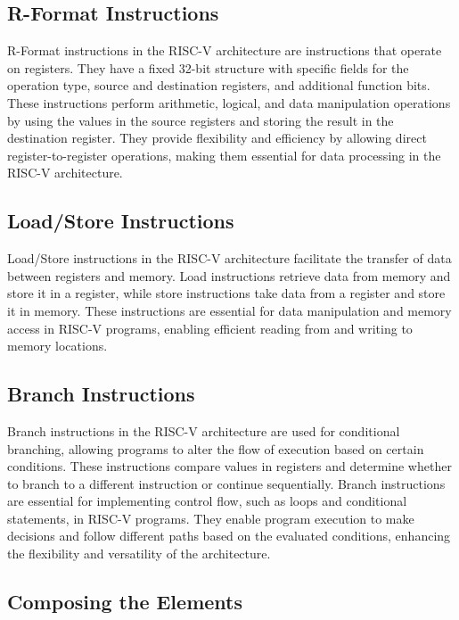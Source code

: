         \subsection{R-Format Instructions}
        
        R-Format instructions in the RISC-V architecture are instructions that operate on registers. They have a fixed 32-bit structure with specific fields for the operation type, source and destination registers, and additional function bits. These instructions perform arithmetic, logical, and data manipulation operations by using the values in the source registers and storing the result in the destination register. They provide flexibility and efficiency by allowing direct register-to-register operations, making them essential for data processing in the RISC-V architecture.
        
        \subsection{Load/Store Instructions}
        
        Load/Store instructions in the RISC-V architecture facilitate the transfer of data between registers and memory. Load instructions retrieve data from memory and store it in a register, while store instructions take data from a register and store it in memory. These instructions are essential for data manipulation and memory access in RISC-V programs, enabling efficient reading from and writing to memory locations.
        
        \subsection{Branch Instructions}
        
        Branch instructions in the RISC-V architecture are used for conditional branching, allowing programs to alter the flow of execution based on certain conditions. These instructions compare values in registers and determine whether to branch to a different instruction or continue sequentially. Branch instructions are essential for implementing control flow, such as loops and conditional statements, in RISC-V programs. They enable program execution to make decisions and follow different paths based on the evaluated conditions, enhancing the flexibility and versatility of the architecture.
        
        \subsection{Composing the Elements}
        
